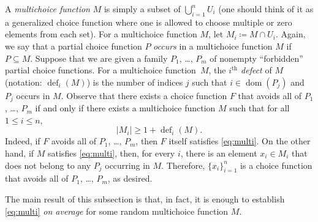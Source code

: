 \documentclass[10pt]{article}
\numberwithin{equation}{subsection}
\theoremstyle{definition}
\begin{document}
	A \emph{multichoice function} $M$ is simply a subset of $\bigcup_{i=1}^n U_i$ (one should think of it as a generalized choice function where one is allowed to choose multiple or zero elements from each set). For a multichoice function $M$, let $M_i \coloneqq M \cap U_i$. Again, we say that a partial choice function $P$ \emph{occurs} in a multichoice function $M$ if $P \subseteq M$. Suppose that we are given a family $P_1$, \ldots, $P_m$ of nonempty ``forbidden'' partial choice functions. For a multichoice function~$M$, the \emph{$i^\text{th}$ defect} of $M$ (notation: $\operatorname{def}_i(M)$) is the number of indices $j$ such that $i \in \operatorname{dom}(P_j)$ and $P_j$ occurs in $M$. Observe that there exists a choice function $F$ that avoids all of $P_1$, \ldots, $P_m$ if and only if there exists a multichoice function $M$ such that for all $1 \leq i \leq n$,
	\begin{equation}\label{eq:multi}
	|M_i| \geq 1 + \operatorname{def}_i(M).
	\end{equation}
	Indeed, if $F$ avoids all of $P_1$, \ldots, $P_m$, then $F$ itself satisfies \eqref{eq:multi}. On the other hand, if $M$ satisfies \eqref{eq:multi}, then, for every $i$, there is an element $x_i \in M_i$ that does not belong to any $P_j$ occurring in $M$. Therefore, $\{x_i\}_{i=1}^n$ is a choice function that avoids all of $P_1$, \ldots, $P_m$, as desired.
	
	The main result of this subsection is that, in fact, it is enough to establish \eqref{eq:multi} \emph{on average} for some random multichoice function $M$.
	
\end{document}
